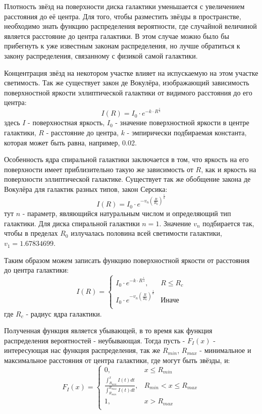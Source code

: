 Плотность звёзд на поверхности диска галактики уменьшается с увеличением расстояния до её центра. Для того, чтобы разместить звёзды в пространстве, необходимо знать функцию распределения вероятности, где случайной величиной является расстояние до центра галактики. В этом случае можно было бы прибегнуть к уже известным законам распределения, но лучше обратиться к закону распределения, связанному с физикой самой галактики.

Концентрация звёзд на некотором участке влияет на испускаемую на этом участке светимость. Так же существует закон де Вокулёра, изображающий зависимость поверхностной яркости эллиптической галактики от видимого расстояния до его центра:
\begin{equation}
	I(R) = I_0 \cdot{} e^{-k\cdot{}R^\frac{1}{4}}
\end{equation}
здесь $I$ - поверхностная яркость, $I_0$ - значение поверхностной яркости в центре галактики, $R$ - расстояние до центра, $k$ - эмпирически подбираемая константа, которая может быть равна, например, 0.02.

Особенность ядра спиральной галактики заключается в том, что яркость на его поверхности имеет приблизительно такую же зависимость от $R$, как и яркость на поверхности эллиптической галактике. Существует так же обобщение закона де Вокулёра для галактик разных типов, закон Серсика:
\begin{equation}
	I(R) = I_0 \cdot{} e^{-v_n(\frac{R}{R_0})^\frac{1}{n}}
\end{equation}
тут $n$ - параметр, являющийся натуральным числом и определяющий тип галактики. Для диска спиральной галактики $n = 1$. Значение $v_n$ подбирается так, чтобы в пределах $R_0$ излучалась половина всей светимости галактики, $v_1 = 1.67834699$.

Таким образом можем записать функцию поверхностной яркости от расстояния до центра галактики:
\begin{equation}
    I(R) = \left\{ \begin{array}{ll}
		I_0 \cdot{} e^{-k\cdot{}R^\frac{1}{4}}, 		& \textrm{$R \leq{} R_c$}\\
		I_0 \cdot{} e^{-v_n(\frac{R}{R_0})^\frac{1}{n}} & \textrm{Иначе}\\
	               \end{array} \right.
\end{equation}
где $R_c$ - радиус ядра галактики.

Полученная функция является убывающей, в то время как функция распределения вероятностей - неубывающая. Тогда пусть - $F_I(x)$ - интересующая нас функция распределения, так же $R_{min}$, $R_{max}$ - минимальное и максимальное расстояния от центра галактики, где могут быть звёзды, и:
\begin{equation} \label{eq:F_I}
	F_I(x) = \left\{ \begin{array}{ll}
		0, & \textrm{$x \leq{} R_{min}$}\\
		\frac{\int_{R_{min}}^x I(t)dt}{\int_{R_{min}}^{R_{max}} I(t)dt}, & \textrm{$R_{min} < x \leq{} R_{max}$}\\
		1, & \textrm{$x > R_{max}$}\\
			 \end{array} \right.
\end{equation}

